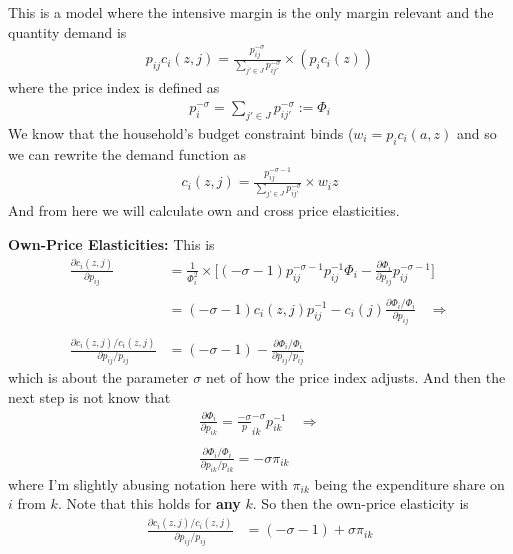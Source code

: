 \documentclass[pdftex,11pt]{article}
\begin{document}
This is a model where the intensive margin is the only margin relevant and the quantity demand is
\begin{align}
\nonumber
p_{ij} c_i(z,j)= \frac{p_{ij}^{-\sigma}}{\sum\limits_{j' \in J} p_{ij'}^{-\sigma}} \times \left( p_{i} c_{i}(z) \right)
\end{align}
where the price index is defined as
\begin{align}
\nonumber 
p_{i}^{-\sigma} = \sum\limits_{j' \in J} p_{ij'}^{-\sigma} := \Phi_i
\end{align}
We know that the household's budget constraint binds ($w_i =  p_{i} c_{i}(a,z)$ and so we can rewrite the demand function as 
\begin{align}
\nonumber
c_i(z,j)= \frac{p_{ij}^{-\sigma-1}}{\sum\limits_{j' \in J} p_{ij'}^{-\sigma}} \times w_i z
\end{align}
And from here we will calculate own and cross price elasticities.

\textbf{Own-Price Elasticities:} This is
\begin{align} 
 \frac{\partial c_{i}(z,j) }{\partial p_{ij}} &= \frac{1}{\Phi_i^2}\times \Bigg [ (-\sigma -1 ) p_{ij}^{-\sigma - 1} p_{ij}^{-1} \Phi_{i} - \frac{\partial \Phi_{i}}{\partial p_{ij}} p_{ij}^{-\sigma - 1} \Bigg ] \\
\nonumber \\
&= (-\sigma -1 )c_{i}(z,j) p_{ij}^{-1} - c_{i}(j)\frac{\partial \Phi_{i} / \Phi_{i}}{\partial p_{ij}} \ \ \ \ \Rightarrow \\
\nonumber \\
 \frac{\partial c_{i}(z,j)/ c_{i}(z,j)}{\partial p_{ij} / p_{ij}}  &= (-\sigma -1 ) - \frac{\partial \Phi_{i} / \Phi_{i} }{\partial p_{ij}/ p_{ij}}
\end{align}
which is about the parameter $\sigma$ net of how the price index adjusts. And then the next step is not know that 
\begin{align} 
\frac{\partial \Phi_{i} }{\partial p_{ik}} = \frac{-\sigma}p_{ik}^{-\sigma}p_{ik}^{-1}  \ \ \ \ \Rightarrow \\
\nonumber \\
 \frac{\partial \Phi_{i} / \Phi_{i} }{\partial p_{ik} / p_{ik}} = -\sigma \pi_{ik}
\end{align}
where I'm slightly abusing notation here with $\pi_{ik}$ being the expenditure share on $i$ from $k$. Note that this holds for \textbf{any} $k$. So then the own-price elasticity is 
\begin{align} 
\frac{\partial c_{i}(z,j)/ c_{i}(z,j)}{\partial p_{ij} / p_{ij}}  &= (-\sigma -1 ) + \sigma \pi_{ik}
\end{align}
\end{document}
